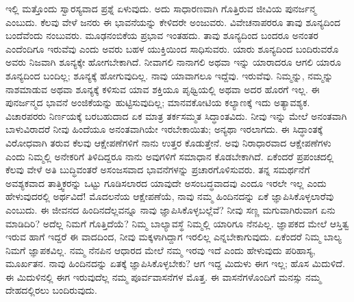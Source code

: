 ಇಲ್ಲಿ ಮತ್ತೊಂದು ಸ್ವಾರಸ್ಯವಾದ ಪ್ರಶ್ನೆ ಏಳುವುದು. ಅದು ಸಾಧಾರಣವಾಗಿ ಗೊತ್ತಿರುವ ಜೀವಿಯ ಪುನರ್ಜನ್ಮ ಎಂಬುದು. ಕೆಲವು ವೇಳೆ ಜನರು ಈ ಭಾವನೆಯನ್ನು ಕೇಳಿದರೇ ಅಂಜುವರು. ವಿವೇಚನಾಪರರೂ ತಾವು ಶೂನ್ಯದಿಂದ ಬಂದೆವೆಂದು ನಂಬುವರು. ಮೂಢನಂಬಿಕೆಯ ಪ್ರಭಾವ ಇಂತಹದು. ತಾವು ಶೂನ್ಯದಿಂದ ಬಂದರೂ ಅನಂತರ ಎಂದೆಂದಿಗೂ ಇರುವೆವು ಎಂದು ಅವರು ಬಹಳ ಯುಕ್ತಿಯಿಂದ ಸಾಧಿಸುವರು. ಯಾರು ಶೂನ್ಯದಿಂದ ಬಂದಿರುವರೊ ಅವರು ನಿಜವಾಗಿ ಶೂನ್ಯಕ್ಕೇ ಹೋಗಬೇಕಾಗಿದೆ. ನೀವಾಗಲಿ ನಾನಾಗಲಿ ಅಥವಾ ಇನ್ನು ಯಾರಾದರೂ ಆಗಲಿ ಯಾರೂ ಶೂನ್ಯದಿಂದ ಬಂದಿಲ್ಲ; ಶೂನ್ಯಕ್ಕೆ ಹೋಗುವುದಿಲ್ಲ. ನಾವು ಯಾವಾಗಲೂ ಇದ್ದೆವು. ಇರುವೆವು. ನಿಮ್ಮನ್ನು, ನಮ್ಮನ್ನು ನಾಶಮಾಡುವ ಅಥವಾ ಶೂನ್ಯಕ್ಕೆ ಕಳಿಸುವ ಯಾವ ಶಕ್ತಿಯೂ ಪೃಥ್ವಿಯಲ್ಲಿ ಅಥವಾ ಅದರ ಹೊರಗೆ ಇಲ್ಲ. ಈ ಪುನರ್ಜನ್ಮದ ಭಾವನೆ ಅಂಜಿಕೆಯನ್ನು ಹುಟ್ಟಿಸುವುದಿಲ್ಲ; ಮಾನವಕೋಟಿಯ ಕಲ್ಯಾಣಕ್ಕೆ ಇದು ಅತ್ಯಾವಶ್ಯಕ. ವಿಚಾರಪರರು ನಿರ್ಣಯಕ್ಕೆ ಬರಬಹುದಾದ ಏಕ ಮಾತ್ರ ತರ್ಕಸಮ್ಮತ ಸಿದ್ಧಾಂತವಿದು. ನೀವು ಇನ್ನು ಮೇಲೆ ಅನಂತವಾಗಿ ಬಾಳುವಿರಾದರೆ ನೀವು ಹಿಂದೆಯೂ ಅನಂತವಾಗಿಯೇ ಇರಬೇಕಾಯಿತು; ಅನ್ಯಥಾ ಇರಲಾಗದು. ಈ ಸಿದ್ಧಾಂತಕ್ಕೆ ವಿರೋಧವಾಗಿ ತರುವ ಕೆಲವು ಆಕ್ಷೇಪಣೆಗಳಿಗೆ ನಾನು ಉತ್ತರ ಕೊಡುತ್ತೇನೆ. ಅವು ನಿರಾಧಾರವಾದ ಆಕ್ಷೇಪಣೆಗಳು ಎಂದು ನಿಮ್ಮಲ್ಲಿ ಅನೇಕರಿಗೆ ತಿಳಿದಿದ್ದರೂ ನಾನು ಅವುಗಳಿಗೆ ಸಮಾಧಾನ ಕೊಡಬೇಕಾಗಿದೆ. ಏಕೆಂದರೆ ಪ್ರಪಂಚದಲ್ಲಿ ಕೆಲವು ವೇಳೆ ಅತಿ ಬುದ್ಧಿವಂತರೆ ಅಸಂಜಸವಾದ ಭಾವನೆಗಳನ್ನು ಪ್ರಚಾರಗೊಳಿಸುವರು. ತನ್ನ ಸಮರ್ಥನೆಗೆ ಅವಶ್ಯಕವಾದ ತಾತ್ತ್ವಿಕರನ್ನು ಒಟ್ಟು ಗೂಡಿಸಲಾರದ ಯಾವುದೇ ಅಸಂಬದ್ಧವಾದವು ಎಂದೂ ಇರಲೇ ಇಲ್ಲ ಎಂದು ಹೇಳುವುದರಲ್ಲಿ ಅರ್ಥವಿದೆ! ಮೊದಲನೆಯ ಆಕ್ಷೇಪಣೆಯೆ, ನಾವು ನಮ್ಮ ಹಿಂದಿನದನ್ನು ಏಕೆ ಜ್ಞಾಪಿಸಿಕೊಳ್ಳಲಾರೆವು ಎಂಬುದು. ಈ ಜೀವನದ ಹಿಂದಿನದೆಲ್ಲವನ್ನೂ ನಾವು ಜ್ಞಾಪಿಸಿಕೊಳ್ಳಬಲ್ಲೆವೆ? ನೀವು ಸಣ್ಣ ಮಗುವಾಗಿರುವಾಗ ಏನು ಮಾಡಿದಿರಿ? ಅದೆಲ್ಲ ನಿಮಗೆ ಗೊತ್ತಿದೆಯೆ? ನಿಮ್ಮ ಬಾಲ್ಯಾವಸ್ಥೆ ನಿಮ್ಮಲ್ಲಿ ಯಾರಿಗೂ ನೆನಪಿಲ್ಲ. ಜ್ಞಾಪಕದ ಮೇಲೆ ಆಸ್ತಿತ್ವ ಇರುವ ಹಾಗೆ ಇದ್ದರೆ ಈ ವಾದದಿಂದ, ನೀವು ಮಕ್ಕಳಾಗಿದ್ದಾಗ ಇರಲಿಲ್ಲ ಎನ್ನಬೇಕಾಗುವುದು. ಏಕೆಂದರೆ ನಿಮ್ಮ ಬಾಲ್ಯ ನಿಮಗೆ ಜ್ಞಾಪಕವಿಲ್ಲ. ನಮ್ಮ ನೆನಪಿನ ಆಧಾರದ ಮೇಲೆ ನಮ್ಮ ಇರವು ಇದೆ ಎಂದು ಹೇಳುವುದು ಪರಿಹಾಸ್ಯ, ಮೂರ್ಖತನ. ನಾವು ಹಿಂದಿನದನ್ನು ಏತಕ್ಕೆ ಜ್ಞಾಪಿಸಿಕೊಳ್ಳಬೇಕು? ಆಗ ಇದ್ದ ಮಿದುಳು ಈಗ ಇಲ್ಲ; ಹೊಸ ಮಿದುಳಿದೆ. ಈ ಮಿದುಳಿನಲ್ಲಿ ಈಗ ಇರುವುದೆಲ್ಲ ನಮ್ಮ ಪೂರ್ವವಾಸನೆಗಳ ಮೊತ್ತ. ಈ ವಾಸನೆಗಳೊಂದಿಗೆ ಮನಸ್ಸು ನಮ್ಮ ದೇಹದಲ್ಲಿರಲು ಬಂದಿರುವುದು.

\vskip 0.2cm

